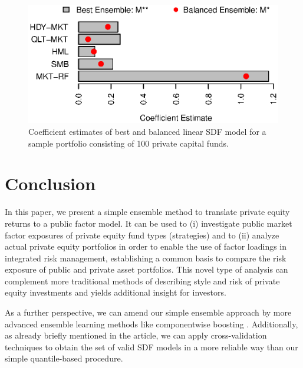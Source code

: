 \documentclass[12pt]{article}
\begin{document}
\begin{figure}[H]
	\centering
	\includegraphics{Figures/Coefs100Pofo}
	\caption{Coefficient estimates of best and balanced linear SDF model for a sample portfolio consisting of 100 private capital funds.}
	\label{fig:coef_barchart_100_pofo}
\end{figure}



\section{Conclusion}
\label{sec:conclusion}

In this paper, we present a simple ensemble method to translate private equity returns to a public factor model. 
It can be used to (i) investigate public market factor exposures of private equity fund types (strategies) and to (ii) analyze actual private equity portfolios in order to enable the use of factor loadings in integrated risk management, establishing a common basis to compare the risk exposure of public and private asset portfolios. 
This novel type of analysis can complement more traditional methods of describing style and risk of private equity investments and yields additional insight for investors.
 
As a further perspective, we can amend our simple ensemble approach by more advanced ensemble learning methods like componentwise boosting \citep{B06,T19}.
Additionally, as already briefly mentioned in the article, we can apply cross-validation techniques to obtain the set of valid SDF models in a more reliable way than our simple quantile-based procedure.





\newpage
\end{document}
